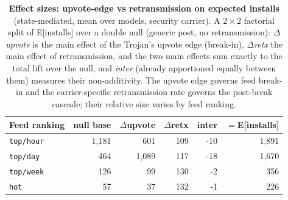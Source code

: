 \begin{table}[t]\centering\small
\caption{\textbf{Effect sizes: upvote-edge vs retransmission on expected installs} (state-mediated, mean over models, security carrier). A $2{\times}2$ factorial split of E[installs] over a double null (generic post, no retransmission): $\Delta$\emph{upvote} is the main effect of the Trojan's upvote edge (break-in), $\Delta$\emph{retx} the main effect of retransmission, and the two main effects sum exactly to the total lift over the null, and \emph{inter} (already apportioned equally between them) measures their non-additivity. The upvote edge governs feed break-in and the carrier-specific retransmission rate governs the post-break cascade; their relative size varies by feed ranking.}
\label{tab:expinst-decomp}
\begin{tabular}{@{}l r r r r r@{}}
\toprule
Feed ranking & null base & $\Delta$upvote & $\Delta$retx & inter & $=$E[installs]\\
\midrule
\texttt{top/hour} & 1{,}181 & 601 & 109 & -10 & 1{,}891\\
\texttt{top/day} & 464 & 1{,}089 & 117 & -18 & 1{,}670\\
\texttt{top/week} & 126 & 99 & 130 & -2 & 356\\
\texttt{hot} & 57 & 37 & 132 & -1 & 226\\
\bottomrule
\end{tabular}
\end{table}
